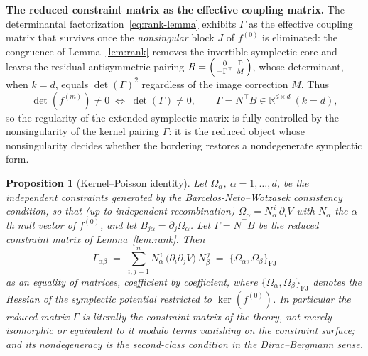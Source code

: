 \documentclass[11pt,a4paper]{article}
\newtheorem{proposition}{Proposition}
\begin{document}
\medskip
\noindent\textbf{The reduced constraint matrix as the effective coupling matrix.}
The determinantal factorization~\eqref{eq:rank-lemma} exhibits $\Gamma$ as the effective coupling matrix that survives once the \emph{nonsingular} block $J$ of $f^{(0)}$ is eliminated: the congruence of Lemma~\ref{lem:rank} removes the invertible symplectic core and leaves the residual antisymmetric pairing $R=\begin{psmallmatrix}0 & \Gamma \\ -\Gamma^{\top} & M\end{psmallmatrix}$, whose determinant, when $k=d$, equals $\det(\Gamma)^2$ regardless of the image correction $M$. Thus
\begin{equation}\label{eq:genschur-appx}
	\det(f^{(m)}) \neq 0 \;\iff\; \det(\Gamma) \neq 0, \qquad \Gamma = N^{\top}B \in \mathbb{R}^{d\times d}\ (k=d),
\end{equation}
so the regularity of the extended symplectic matrix is fully controlled by the nonsingularity of the kernel pairing $\Gamma$: it is the reduced object whose nonsingularity decides whether the bordering restores a nondegenerate symplectic form.

\begin{proposition}[Kernel--Poisson identity]\label{prop:schurpoisson}
	Let $\Omega_\alpha$, $\alpha = 1, \ldots, d$, be the independent constraints generated by the Barcelos-Neto--Wotzasek consistency condition, so that (up to independent recombination) $\Omega_\alpha = N_\alpha^{\,i}\,\partial_i V$ with $N_\alpha$ the $\alpha$-th null vector of $f^{(0)}$, and let $B_{j\alpha} = \partial_j \Omega_\alpha$. Let $\Gamma = N^{\top}B$ be the reduced constraint matrix of Lemma~\ref{lem:rank}. Then
	\begin{equation}\label{eq:schurpoisson-appx}
		\Gamma_{\alpha\beta} \;=\; \sum_{i,j=1}^{n} N_\alpha^{\,i}\,\bigl(\partial_i\partial_j V\bigr)\,N_\beta^{\,j} \;=\; \{\Omega_\alpha, \Omega_\beta\}_{\mathrm{FJ}}
	\end{equation}
	as an equality of matrices, coefficient by coefficient, where $\{\Omega_\alpha,\Omega_\beta\}_{\mathrm{FJ}}$ denotes the Hessian of the symplectic potential restricted to $\ker(f^{(0)})$. In particular the reduced matrix $\Gamma$ is \emph{literally} the constraint matrix of the theory, not merely isomorphic or equivalent to it modulo terms vanishing on the constraint surface; and its nondegeneracy is the second-class condition in the Dirac--Bergmann sense.
\end{proposition}
\end{document}
